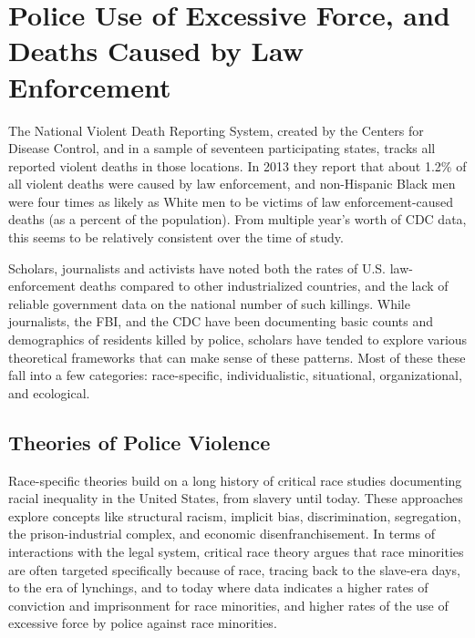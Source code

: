 \documentclass[sigconf]{acmart}
\begin{document}
\section{Police Use of Excessive Force, and Deaths Caused by Law Enforcement}
The National Violent Death Reporting System, created by the Centers for Disease Control, and  in a sample of seventeen participating states, tracks all reported violent deaths in those locations.  In 2013 they report that about 1.2\% of all violent deaths were caused by law enforcement, and non-Hispanic Black men were four times as likely as White men to be victims of law enforcement-caused deaths (as a percent of the population). \cite{cdc13}  From multiple year's worth of CDC data, this seems to be relatively consistent over the time of study.  

Scholars, journalists and activists have noted both the rates of U.S. law-enforcement deaths compared to other industrialized countries, and the lack of reliable government data on the national number of such killings. \cite{currie16,pridemore05,dalton17,lartey15,ser16}  While journalists, the FBI, and the CDC have been documenting basic counts and demographics of residents killed by police, scholars have tended to explore various theoretical frameworks that can make sense of these patterns.  Most of these these fall into a few categories: race-specific, individualistic, situational, organizational, and ecological. \cite{nix17,provine11,smith14,chaney13}

\subsection{Theories of Police Violence}
Race-specific theories build on a long history of critical race studies documenting racial inequality in the United States, from slavery until today. \cite{provine11,chaney13,meeks06,crichlow14,payne17}  These approaches explore concepts like structural racism, implicit bias, discrimination, segregation, the prison-industrial complex, and economic disenfranchisement.  In terms of interactions with the legal system, critical race theory argues that race minorities are often targeted specifically because of race, tracing back to the slave-era days, to the era of lynchings, and to today where data indicates a higher rates of conviction and imprisonment for race minorities, and higher rates of the use of excessive force by police against race minorities.  \cite{payne17,provine11,meeks06,chaney13,crichlow14,petro03}  
\end{document}
